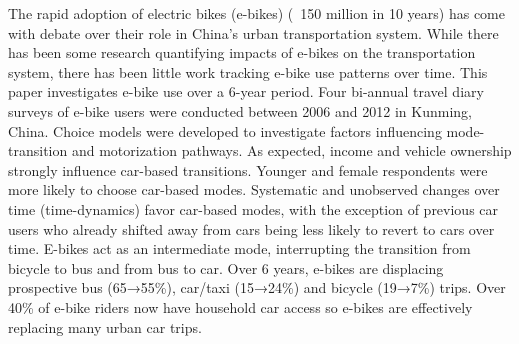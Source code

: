 The rapid adoption of electric bikes (e-bikes) (~150 million in 10 years) has come with debate over their role in China's urban transportation system. While there has been some research quantifying impacts of e-bikes on the transportation system, there has been little work tracking e-bike use patterns over time. This paper investigates e-bike use over a 6-year period. Four bi-annual travel diary surveys of e-bike users were conducted between 2006 and 2012 in Kunming, China. Choice models were developed to investigate factors influencing mode-transition and motorization pathways. As expected, income and vehicle ownership strongly influence car-based transitions. Younger and female respondents were more likely to choose car-based modes. Systematic and unobserved changes over time (time-dynamics) favor car-based modes, with the exception of previous car users who already shifted away from cars being less likely to revert to cars over time. E-bikes act as an intermediate mode, interrupting the transition from bicycle to bus and from bus to car. Over 6 years, e-bikes are displacing prospective bus (65→55\%), car/taxi (15→24\%) and bicycle (19→7\%) trips. Over 40\% of e-bike riders now have household car access so e-bikes are effectively replacing many urban car trips.
